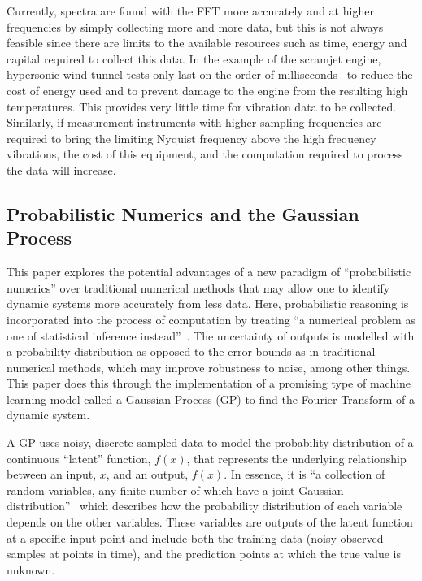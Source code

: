 \documentclass[12pt]{article}
\begin{document}
    Currently, spectra are found with the FFT more accurately and at higher frequencies by simply collecting more and more data, but this is not always feasible since there are limits to the available resources such as time, energy and capital required to collect this data.
    In the example of the scramjet engine, hypersonic wind tunnel tests only last on the order of milliseconds~\cite{Mec463} to reduce the cost of energy used and to prevent damage to the engine from the resulting high temperatures.
    This provides very little time for vibration data to be collected.
    Similarly, if measurement instruments with higher sampling frequencies are required to bring the limiting Nyquist frequency above the high frequency vibrations, the cost of this equipment, and the computation required to process the data will increase.


    \subsection{Probabilistic Numerics and the Gaussian Process}
    This paper explores the potential advantages of a new paradigm of ``probabilistic numerics'' over traditional numerical methods that may allow one to identify dynamic systems more accurately from less data.
    Here, probabilistic reasoning is incorporated into the process of computation by treating ``a numerical problem as one of statistical inference instead''~\cite{ProbabilisticNumerics2023}.
    The uncertainty of outputs is modelled with a probability distribution as opposed to the error bounds as in traditional numerical methods, which may improve robustness to noise, among other things.
    This paper does this through the implementation of a promising type of machine learning model called a Gaussian Process (GP) to find the Fourier Transform of a dynamic system.

    A GP uses noisy, discrete sampled data to model the probability distribution of a continuous ``latent'' function, $f(x)$, that represents the underlying relationship between an input, $x$, and an output, $f(x)$.
    In essence, it is ``a collection of random variables, any finite number of which have a joint Gaussian distribution''~\cite{rasmussen2006gaussian} which describes how the probability distribution of each variable depends on the other variables.
    These variables are outputs of the latent function at a specific input point and include both the training data (noisy observed samples at points in time), and the prediction points at which the true value is unknown.
\end{document}
